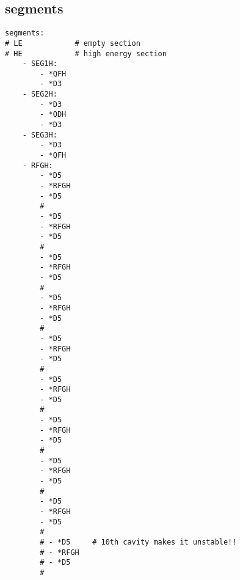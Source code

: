 \documentclass[10pt]{article}
\begin{document}
\begin{itemize}
\subsection{segments}
\begin{verbatim}
segments:
# LE            # empty section
# HE            # high energy section
    - SEG1H:
        - *QFH
        - *D3
    - SEG2H:
        - *D3
        - *QDH
        - *D3
    - SEG3H:
        - *D3
        - *QFH
    - RFGH:
        - *D5
        - *RFGH
        - *D5
        #
        - *D5
        - *RFGH
        - *D5
        #
        - *D5
        - *RFGH
        - *D5
        #
        - *D5
        - *RFGH
        - *D5
        #
        - *D5
        - *RFGH
        - *D5
        #
        - *D5
        - *RFGH
        - *D5
        #
        - *D5
        - *RFGH
        - *D5
        #
        - *D5
        - *RFGH
        - *D5
        #
        - *D5
        - *RFGH
        - *D5
        #
        # - *D5     # 10th cavity makes it unstable!!
        # - *RFGH
        # - *D5
        #
\end{verbatim}
\end{itemize}
\end{document}
